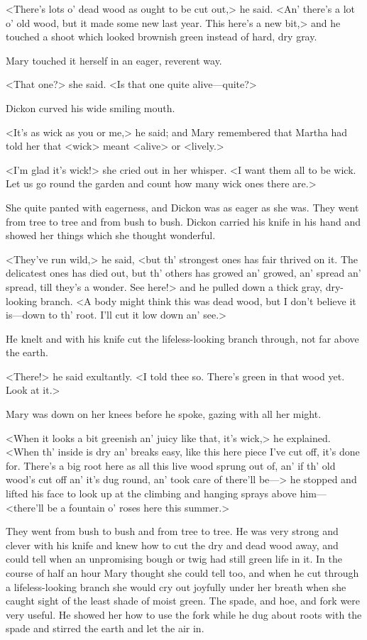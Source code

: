 <There's lots o' dead wood as ought to be cut out,> he said. <An' there's a lot o' old wood, but it made some new last year. This here's a new bit,> and he touched a shoot which looked brownish green instead of hard, dry gray.

Mary touched it herself in an eager, reverent way.

<That one?> she said. <Is that one quite alive—quite?>

Dickon curved his wide smiling mouth.

<It's as wick as you or me,> he said; and Mary remembered that Martha had told her that <wick> meant <alive> or <lively.>

<I'm glad it's wick!> she cried out in her whisper. <I want them all to be wick. Let us go round the garden and count how many wick ones there are.>

She quite panted with eagerness, and Dickon was as eager as she was. They went from tree to tree and from bush to bush. Dickon carried his knife in his hand and showed her things which she thought wonderful.

<They've run wild,> he said, <but th' strongest ones has fair thrived on it. The delicatest ones has died out, but th' others has growed an' growed, an' spread an' spread, till they's a wonder. See here!> and he pulled down a thick gray, dry-looking branch. <A body might think this was dead wood, but I don't believe it is—down to th' root. I'll cut it low down an' see.>

He knelt and with his knife cut the lifeless-looking branch through, not far above the earth.

<There!> he said exultantly. <I told thee so. There's green in that wood yet. Look at it.>

Mary was down on her knees before he spoke, gazing with all her might.

<When it looks a bit greenish an' juicy like that, it's wick,> he explained. <When th' inside is dry an' breaks easy, like this here piece I've cut off, it's done for. There's a big root here as all this live wood sprung out of, an' if th' old wood's cut off an' it's dug round, an' took care of there'll be—> he stopped and lifted his face to look up at the climbing and hanging sprays above him—<there'll be a fountain o' roses here this summer.>

They went from bush to bush and from tree to tree. He was very strong and clever with his knife and knew how to cut the dry and dead wood away, and could tell when an unpromising bough or twig had still green life in it. In the course of half an hour Mary thought she could tell too, and when he cut through a lifeless-looking branch she would cry out joyfully under her breath when she caught sight of the least shade of moist green. The spade, and hoe, and fork were very useful. He showed her how to use the fork while he dug about roots with the spade and stirred the earth and let the air in.


